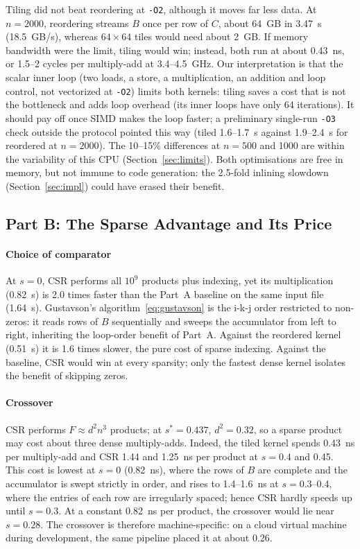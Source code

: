\documentclass[conference,a4paper]{IEEEtran}
\newcommand{\code}[1]{\texttt{#1}}
\begin{document}
Tiling did not beat reordering at \code{-O2}, although it moves far less data.
At $n = 2000$, reordering streams $B$ once per row of $C$, about 64~GB in
3.47~s (18.5~GB/s), whereas $64 \times 64$ tiles would need about 2~GB. If
memory bandwidth were the limit, tiling would win; instead, both run at about
0.43~ns, or 1.5--2 cycles per multiply-add at 3.4--4.5~GHz. Our interpretation
is that the scalar inner loop (two loads, a store, a multiplication, an
addition and loop control, not vectorized at \code{-O2}) limits both kernels:
tiling saves a cost that is not the bottleneck and adds loop overhead (its
inner loops have only 64 iterations). It should pay off once SIMD makes the
loop faster; a preliminary single-run \code{-O3} check outside the protocol
pointed this way (tiled 1.6--1.7~s against 1.9--2.4~s for reordered at
$n = 2000$).
The 10--15\% differences at $n = 500$ and 1000 are within the variability of
this CPU (Section~\ref{sec:limits}). Both optimisations are free in memory, but
not immune to code generation: the 2.5-fold inlining slowdown
(Section~\ref{sec:impl}) could have erased their benefit.

\subsection{Part B: The Sparse Advantage and Its Price}
\label{sec:disc-b}
\paragraph{Choice of comparator} At $s = 0$, CSR performs all $10^9$ products
plus indexing, yet its multiplication (0.82~s) is 2.0 times faster than the
Part~A baseline on the same input file (1.64~s). Gustavson's
algorithm~\eqref{eq:gustavson} is the i-k-j order restricted to non-zeros: it
reads rows of $B$ sequentially and sweeps the accumulator from left to right,
inheriting the loop-order benefit of Part~A. Against the reordered kernel
(0.51~s) it is 1.6 times slower, the pure cost of sparse indexing. Against the
baseline, CSR would win at every sparsity; only the fastest dense kernel
isolates the benefit of skipping zeros.

\paragraph{Crossover} CSR performs $F \approx d^2 n^3$ products; at
$s^* = 0.437$, $d^2 = 0.32$, so a sparse product may cost about three dense
multiply-adds. Indeed, the tiled kernel spends 0.43~ns per multiply-add and CSR
1.44 and 1.25~ns per product at $s = 0.4$ and 0.45. This cost is lowest at
$s = 0$ (0.82~ns), where the rows of $B$ are complete and the accumulator is
swept strictly in order, and rises to 1.4--1.6~ns at $s = 0.3$--0.4, where the
entries of each row are irregularly spaced; hence CSR hardly speeds up until
$s = 0.3$. At a constant 0.82~ns per product, the crossover would lie near
$s = 0.28$. The crossover is therefore machine-specific: on a cloud virtual
machine during development, the same pipeline placed it at about 0.26.
\end{document}
